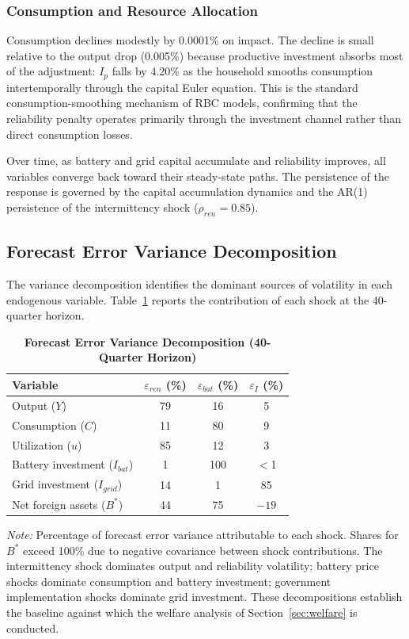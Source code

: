 \documentclass[12pt, a4paper]{article}
\begin{document}
\subsubsection{Consumption and Resource Allocation}

Consumption declines modestly by 0.0001\% on impact. The decline is small relative to the output drop (0.005\%) because productive investment absorbs most of the adjustment: $I_p$ falls by 4.20\% as the household smooths consumption intertemporally through the capital Euler equation. This is the standard consumption-smoothing mechanism of RBC models, confirming that the reliability penalty operates primarily through the investment channel rather than direct consumption losses.

Over time, as battery and grid capital accumulate and reliability improves, all variables converge back toward their steady-state paths. The persistence of the response is governed by the capital accumulation dynamics and the AR(1) persistence of the intermittency shock ($\rho_{ren} = 0.85$).

\subsection{Forecast Error Variance Decomposition} \label{subsec:fevd}

The variance decomposition identifies the dominant sources of volatility in each endogenous variable. Table~\ref{tab:fevd} reports the contribution of each shock at the 40-quarter horizon.

\begin{table}[H]
    \centering
    \caption{\textbf{Forecast Error Variance Decomposition (40-Quarter Horizon)}}
    \label{tab:fevd}
    \renewcommand{\arraystretch}{1.3}
    \small
    \begin{tabular}{l c c c}
        \toprule
        \textbf{Variable} & $\varepsilon_{ren}$ (\%) & $\varepsilon_{bat}$ (\%) & $\varepsilon_I$ (\%) \\
        \midrule
        Output ($Y$) & 79 & 16 & 5 \\
        Consumption ($C$) & 11 & 80 & 9 \\
        Utilization ($u$) & 85 & 12 & 3 \\
        Battery investment ($I_{bat}$) & 1 & 100 & $<$1 \\
        Grid investment ($I_{grid}$) & 14 & 1 & 85 \\
        Net foreign assets ($B^*$) & 44 & 75 & $-19$ \\
        \bottomrule
    \end{tabular}
    \vspace{0.2cm}
    \parbox{\textwidth}{\footnotesize \textit{Note:} Percentage of forecast error variance attributable to each shock. Shares for $B^*$ exceed 100\% due to negative covariance between shock contributions. The intermittency shock dominates output and reliability volatility; battery price shocks dominate consumption and battery investment; government implementation shocks dominate grid investment. These decompositions establish the baseline against which the welfare analysis of Section~\ref{sec:welfare} is conducted.}
\end{table}
\end{document}
